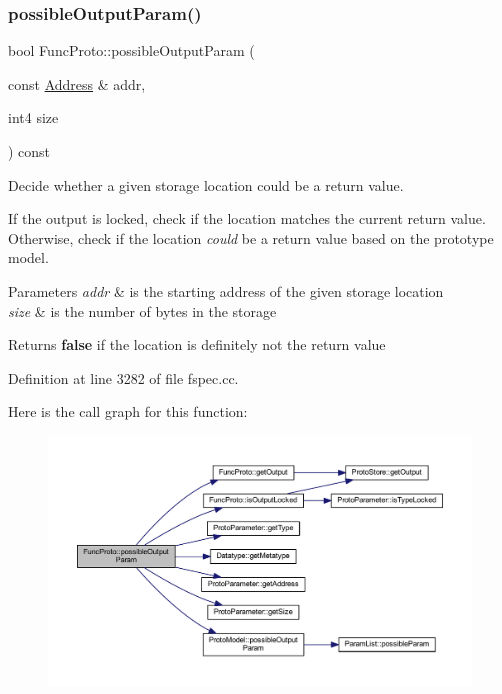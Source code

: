 \subsubsection{\texorpdfstring{possibleOutputParam()}{possibleOutputParam()}}
{\footnotesize\ttfamily bool Func\+Proto\+::possible\+Output\+Param (\begin{DoxyParamCaption}\item[{const \mbox{\hyperlink{class_address}{Address}} \&}]{addr,  }\item[{int4}]{size }\end{DoxyParamCaption}) const}



Decide whether a given storage location could be a return value. 

If the output is locked, check if the location matches the current return value. Otherwise, check if the location {\itshape could} be a return value based on the prototype model. 
\begin{DoxyParams}{Parameters}
{\em addr} & is the starting address of the given storage location \\
\hline
{\em size} & is the number of bytes in the storage \\
\hline
\end{DoxyParams}
\begin{DoxyReturn}{Returns}
{\bfseries{false}} if the location is definitely not the return value 
\end{DoxyReturn}


Definition at line 3282 of file fspec.\+cc.

Here is the call graph for this function\+:
\nopagebreak
\begin{figure}[H]
\begin{center}
\leavevmode
\includegraphics[width=350pt]{class_func_proto_a65c37f6adddd70f3fd17500dcacd0c92_cgraph}
\end{center}
\end{figure}
\mbox{\label{class_func_proto_acf8d609764a4fd6c38cb0c284f225180}} 
